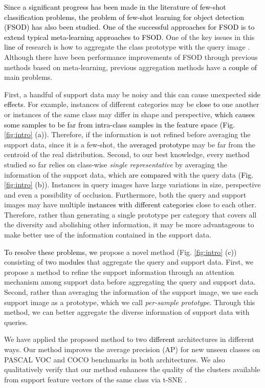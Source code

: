 \documentclass[10pt,twocolumn,letterpaper]{article}
\newcommand{\nj}[1]{\textcolor{black}{#1}}
\newcommand{\hj}[1]{\textcolor{black}{#1}}
\begin{document}
\nj{Since a significant progress has been made in the literature of few-shot classification problems, the problem of few-shot learning for object detection (FSOD) has also been studied. One of the successful approaches for FSOD is to extend typical meta-learning approaches to FSOD.}
One of the key issues in this \nj{line of} research is how to aggregate the class prototype with the query image \cite{xiao2020few, kang2019few, fan2020fsod, yan2019meta, wang2019meta}.
Although there have been performance improvements of FSOD through previous methods based on meta-learning, previous aggregation methods have \nj{a couple of} main problems.

First, a handful of support data may be noisy and this can cause unexpected \nj{side effects}.
For example, instances of different categories may be \nj{close to} one another or instances of the same class may differ in shape and perspective\hj{, which causes some samples  to be far from intra-class samples in the feature space (Fig. \ref{fig:intro} (a))}.
Therefore, if the information is not refined before averaging the support data, since it is a few-shot, the \nj{averaged prototype} may be far from the centroid of the real distribution.
Second, to our best knowledge, every method studied so far relies on class-wise \textit{single representative} by averaging the information of the support data, which \nj{are compared} with the query data \hj{(Fig. \ref{fig:intro} (b))}. Instances in query images have large variations in size, perspective and even a possibility of occlusion. Furthermore, both the query and support images may have multiple \nj{instances with different categories} close to each other. Therefore, rather than 
generating a single prototype per category that covers all the diversity and abolishing other information, it may be more advantageous to make better use of the information contained in the support data.

\nj{To resolve these problems, we} propose a novel method (Fig. \ref{fig:intro} \hj{(c)}) consisting of two \nj{modules} that aggregate the query and support data. First, we propose a method to refine the support information through an attention mechanism among support data before aggregating the query and support data. Second, rather than averaging the information of the support image, we use each support image as a prototype, which we call \textit{per-sample prototype}. Through this method, we can better aggregate the diverse information of support data with queries. 

We have applied the proposed method to two \nj{different} architectures \cite{xiao2020few, fan2020fsod} in different ways. Our method improves the average precision (AP) for new unseen classes on PASCAL VOC  \cite{pascal-voc-2007, pascal-voc-2012} and COCO \cite{lin2015microsoft} benchmarks in both architectures. We also qualitatively verify that our method enhances the quality of the clusters available from support feature vectors of the same class via t-SNE \cite{van2008visualizing}.
\end{document}
